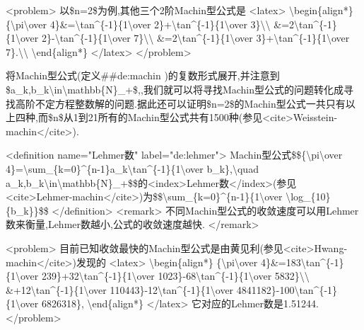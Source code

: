 \documentclass[
]{article}
\begin{document}
\textless problem\textgreater{} 以\$n=2\$为例,其他三个2阶Machin型公式是
\textless latex\textgreater{} \textbackslash begin\{align*\}
\{\textbackslash pi\textbackslash over
4\}\&=\textbackslash tan\^{}\{-1\}\{1\textbackslash over
2\}+\textbackslash tan\^{}\{-1\}\{1\textbackslash over
3\}\textbackslash\textbackslash{}
\&=2\textbackslash tan\^{}\{-1\}\{1\textbackslash over
2\}-\textbackslash tan\^{}\{-1\}\{1\textbackslash over
7\}\textbackslash\textbackslash{}
\&=2\textbackslash tan\^{}\{-1\}\{1\textbackslash over
3\}+\textbackslash tan\^{}\{-1\}\{1\textbackslash over
7\}.\textbackslash\textbackslash{} \textbackslash end\{align*\}
\textless/latex\textgreater{} \textless/problem\textgreater{}

将Machin型公式(定义\#\#de:machin
)的复数形式展开,并注意到\$a\_k,b\_k\textbackslash in\textbackslash mathbb\{N\}\_+\$,,我们就可以将寻找Machin型公式的问题转化成寻找高阶不定方程整数解的问题.据此还可以证明\$n=2\$的Machin型公式一共只有以上四种,而\$n\$从1到21所有的Machin型公式共有1500种(参见\textless cite\textgreater Weisstein-machin\textless/cite\textgreater).

\textless definition name="Lehmer数" label="de:lehmer"\textgreater{}
Machin型公式\$\$\{\textbackslash pi\textbackslash over
4\}=\textbackslash sum\_\{k=0\}\^{}\{n-1\}a\_k\textbackslash tan\^{}\{-1\}\{1\textbackslash over
b\_k\},\textbackslash quad
a\_k,b\_k\textbackslash in\textbackslash mathbb\{N\}\_+\$\$的\textless index\textgreater Lehmer数\textless/index\textgreater(参见\textless cite\textgreater Lehmer-machin\textless/cite\textgreater)为\$\$\textbackslash sum\_\{k=0\}\^{}\{n-1\}\{1\textbackslash over
\textbackslash log\_\{10\}\{b\_k\}\}\$\$
\textless/definition\textgreater{} \textless remark\textgreater{}
不同Machin型公式的收敛速度可以用Lehmer数来衡量,Lehmer数越小,公式的收敛速度越快.
\textless/remark\textgreater{}

\textless problem\textgreater{}
目前已知收敛最快的Machin型公式是由黄见利(参见\textless cite\textgreater Hwang-machin\textless/cite\textgreater)发现的
\textless latex\textgreater{} \textbackslash begin\{align*\}
\{\textbackslash pi\textbackslash over
4\}\&=183\textbackslash tan\^{}\{-1\}\{1\textbackslash over
239\}+32\textbackslash tan\^{}\{-1\}\{1\textbackslash over
1023\}-68\textbackslash tan\^{}\{-1\}\{1\textbackslash over
5832\}\textbackslash\textbackslash{}
\&+12\textbackslash tan\^{}\{-1\}\{1\textbackslash over
110443\}-12\textbackslash tan\^{}\{-1\}\{1\textbackslash over
4841182\}-100\textbackslash tan\^{}\{-1\}\{1\textbackslash over
6826318\}, \textbackslash end\{align*\} \textless/latex\textgreater{}
它对应的Lehmer数是1.51244. \textless/problem\textgreater{}
\end{document}
